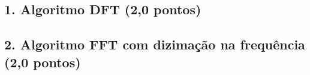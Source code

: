 \subsection*{1. Algoritmo DFT \textbf{(2,0 pontos)}}

\subsection*{2. Algoritmo FFT com dizimação na frequência \textbf{(2,0 pontos)}}
